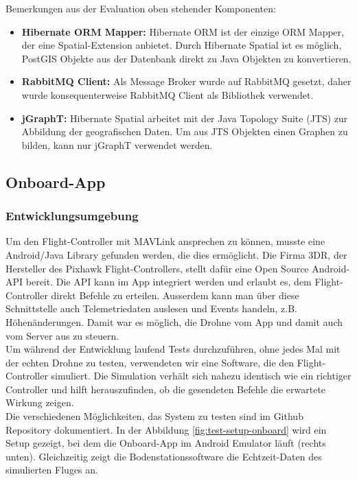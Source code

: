 Bemerkungen aus der Evaluation oben stehender Komponenten:
\begin{itemize}
	\item{\textbf{Hibernate ORM Mapper:} Hibernate ORM ist der einzige ORM Mapper, der eine Spatial-Extension anbietet. Durch Hibernate Spatial ist es möglich, PostGIS Objekte aus der Datenbank direkt zu Java Objekten zu konvertieren.}
	\item{\textbf{RabbitMQ Client:} Als Message Broker wurde auf RabbitMQ gesetzt, daher wurde konsequenterweise RabbitMQ Client als Bibliothek verwendet.}
	\item{\textbf{jGraphT:} Hibernate Spatial arbeitet mit der Java Topology Suite (\Gls{JTS}) zur Abbildung der geografischen Daten. Um aus \Gls{JTS} Objekten einen Graphen zu bilden, kann nur jGraphT verwendet werden.}
\end{itemize}

\subsection{Onboard-App}

\subsubsection{Entwicklungsumgebung}
Um den \Gls{Flight-Controller} mit \Gls{MAVLink} ansprechen zu können, musste eine Android/Java Library gefunden werden, die dies ermöglicht. Die Firma 3DR, der Hersteller des Pixhawk \Gls{Flight-Controller}s, stellt dafür eine Open Source Android-API bereit. Die API kann im App integriert werden und erlaubt es, dem \Gls{Flight-Controller} direkt Befehle zu erteilen. Ausserdem kann man über diese Schnittstelle auch Telemetriedaten auslesen und Events handeln, z.B. Höhenänderungen. Damit war es möglich, die Drohne vom App und damit auch vom Server aus zu steuern.\\

Um während der Entwicklung laufend Tests durchzuführen, ohne jedes Mal mit der echten Drohne zu testen, verwendeten wir eine Software, die den \Gls{Flight-Controller} simuliert. Die Simulation verhält sich nahezu identisch wie ein richtiger Controller und hilft herauszufinden, ob die gesendeten Befehle die erwartete Wirkung zeigen. \\

Die verschiedenen Möglichkeiten, das System zu testen sind im Github Repository dokumentiert. In der Abbildung \ref{fig:test-setup-onboard} wird ein Setup gezeigt, bei dem die Onboard-App im Android Emulator läuft (rechts unten). Gleichzeitig zeigt die Bodenstationssoftware die Echtzeit-Daten des simulierten Fluges an.


